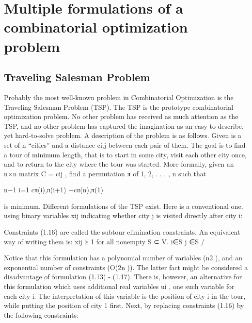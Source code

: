 \documentclass[titlepage]{book}
\begin{document}
\section{Multiple formulations of a combinatorial optimization problem}

\subsection{Traveling Salesman Problem}

Probably the most well-known problem in Combinatorial Optimization is the Traveling Salesman Problem
(TSP). The TSP is the prototype combinatorial optimization problem. No other problem has received as
much attention as the TSP, and no other problem has captured the imagination as an easy-to-describe,
yet hard-to-solve problem. A description of the problem is as follows. Given is a set of n “cities” and a
distance ci,j between each pair of them. The goal is to find a tour of minimum length, that is to start in
some city, visit each other city once, and to return to the city where the tour was started. More formally,
given an n×n matrix C = cij , find a permutation π of {1, 2, . . . , n} such that

n−1
i=1 cπ(i),π(i+1) +cπ(n),π(1)

is minimum.
Different formulations of the TSP exist. Here is a conventional one, using binary variables xij indicating
whether city j is visited directly after city i:


Constraints (1.16) are called the subtour elimination constraints. An equivalent way of writing them is:
xij ≥ 1 for all nonempty S ⊂ V.
i∈S j ∈S
/

Notice that this formulation has a polynomial number of variables (n2 ), and an exponential number of
constraints (O(2n )). The latter fact might be considered a disadvantage of formulation (1.13) - (1.17).
There is, however, an alternative for this formulation which uses additional real variables ui , one such
variable for each city i. The interpretation of this variable is the position of city i in the tour, while
putting the position of city 1 first. Next, by replacing constraints (1.16) by the following constraints:

\end{document}

